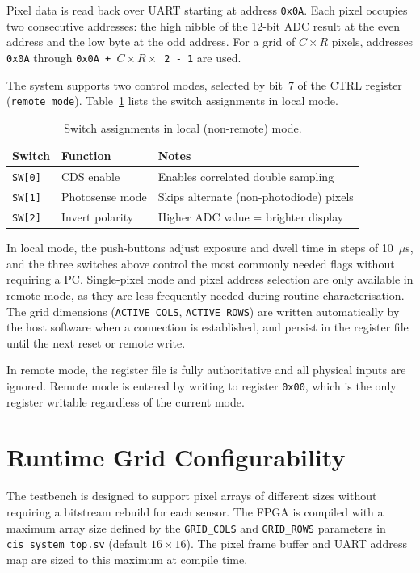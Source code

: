 Pixel data is read back over UART starting at address \texttt{0x0A}. Each pixel occupies two consecutive addresses: the high nibble of the 12-bit ADC result at the even address and the low byte at the odd address. For a grid of $C \times R$ pixels, addresses \texttt{0x0A} through \texttt{0x0A + $C \times R \times$ 2 - 1} are used.

The system supports two control modes, selected by bit~7 of the CTRL register (\texttt{remote\_mode}). Table~\ref{tab:local_switches} lists the switch assignments in local mode.

\begin{table}[h]
\centering
\caption{Switch assignments in local (non-remote) mode.}
\label{tab:local_switches}
\begin{tabular}{lll}
\hline
\textbf{Switch} & \textbf{Function} & \textbf{Notes} \\
\hline
\texttt{SW[0]} & CDS enable        & Enables correlated double sampling \\
\texttt{SW[1]} & Photosense mode   & Skips alternate (non-photodiode) pixels \\
\texttt{SW[2]} & Invert polarity   & Higher ADC value = brighter display \\
\hline
\end{tabular}
\end{table}

In local mode, the push-buttons adjust exposure and dwell time in steps of 10~$\mu$s, and the three switches above control the most commonly needed flags without requiring a PC. Single-pixel mode and pixel address selection are only available in remote mode, as they are less frequently needed during routine characterisation. The grid dimensions (\texttt{ACTIVE\_COLS}, \texttt{ACTIVE\_ROWS}) are written automatically by the host software when a connection is established, and persist in the register file until the next reset or remote write.

In remote mode, the register file is fully authoritative and all physical inputs are ignored. Remote mode is entered by writing to register \texttt{0x00}, which is the only register writable regardless of the current mode.

\section{Runtime Grid Configurability}

The testbench is designed to support pixel arrays of different sizes without requiring a bitstream rebuild for each sensor. The FPGA is compiled with a maximum array size defined by the \texttt{GRID\_COLS} and \texttt{GRID\_ROWS} parameters in \texttt{cis\_system\_top.sv} (default $16 \times 16$). The pixel frame buffer and UART address map are sized to this maximum at compile time.

